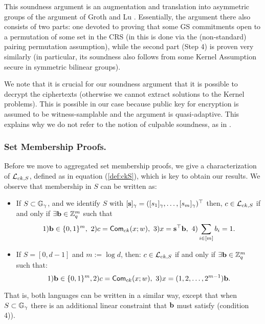 This soundness argument is an augmentation and translation into asymmetric groups of the argument of Groth and Lu \cite{AC:GroLu07}. Essentially, the argument there also consists of two parts: one devoted to proving that some GS commitments open to a permutation of some set in the CRS (in \cite{AC:GroLu07} this is done via the (non-standard) pairing permutation assumption), while the second part (Step 4) is proven very similarly (in particular, its soundness also follows from some Kernel Assumption secure in symmetric bilinear groups). 

We note that it is crucial for our soundness argument that it is possible to decrypt the ciphertexts (otherwise we cannot extract solutions to the Kernel problems). This is possible in our case because public key for encryption is assumed to be witness-samplable and the argument is quasi-adaptive. This explains why we do not refer to the notion of culpable soundness, as in \cite{AC:GroLu07,EPRINT:FauLip15}.


\subsubsection{Set Membership Proofs.} Before we move to aggregated set membership proofs, we give a characterization of $\mathcal{L}_{ck,S}$, defined as in equation (\ref{def:ckS}), which is key to obtain our results. We observe that membership in $S$ can be written as:
\begin{itemize}
\item If $S \subset \mathbb{G}_{\gamma}$, and we identify $S$ with $[\mathbf{s}]_\gamma=([s_1]_\gamma,\ldots,[s_m]_\gamma)^\top$ then, 
$c \in \mathcal{L}_{ck,S}$ if and only if $\exists \mathbf{b} \in \mathbb{Z}_q^{m}$ such that
\vspace{-0.3cm}
$$ 1) \mathbf{b} \in \{0,1\}^{m}, \ 2) c=\mathsf{Com}_{ck}(x;w), \ 3) x=\mathbf{s}^{\top} \mathbf{b}, \ 4) \sum_{i \in [m]} b_i=1.$$
\vspace{-0.3cm}
\item If $S=[0,d-1]$ and $m:=\log d$, then: 
$c \in \mathcal{L}_{ck,S}$ if and only if $\exists \mathbf{b} \in \mathbb{Z}_q^{m}$ such that:   
\vspace{-0.3cm}
$$ 1) \mathbf{b} \in \{0,1\}^{m}, 2) c=\mathsf{Com}_{ck}(x;w), \ 3) x=(1,2,\ldots,2^{m-1}) \mathbf{b} .$$
\end{itemize} 
\vspace{-0.2cm}
That is, both languages can be written in a similar way, except that when $S \subset \mathbb{G}_{\gamma}$ there is an additional linear constraint that $\mathbf{b}$ must satisfy (condition 4)). 

